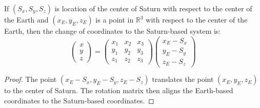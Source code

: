 \documentclass[crop=false,class=article,oneside]{standalone}
\begin{document}
        \begin{theorem}
            If $(S_{x},S_{y},S_{z})$ is location of the
            center of Saturn with respect to the
            center of the Earth and $(x_{E},y_{E},z_{E})$
            is a point in $\mathbb{R}^{3}$ with respect
            to the center of the Earth, then the
            change of coordinates to the
            Saturn-based system is:
            \begin{equation*}
                    \begin{pmatrix}
                        x\\
                        y\\
                        z
                    \end{pmatrix}
                    =
                    \begin{pmatrix}
                        x_{1}&x_{2}&x_{3}\\
                        y_{1}&y_{2}&y_{3}\\
                        z_{1}&z_{2}&z_{3}
                    \end{pmatrix}
                    \begin{pmatrix}
                        x_{E}-S_{x}\\
                        y_{E}-S_{y}\\
                        z_{E}-S_{z}
                    \end{pmatrix}
                \end{equation*}
        \end{theorem}
        \begin{proof}
            The point
            $(x_{E}-S_{x},y_{E}-S_{y},z_{E}-S_{z})$
            translates the point $(x_{E},y_{E},z_{E})$
            to the center of Saturn.
            The rotation matrix then aligns the
            Earth-based coordinates to the
            Saturn-based coordinates.
        \end{proof}
\end{document}
